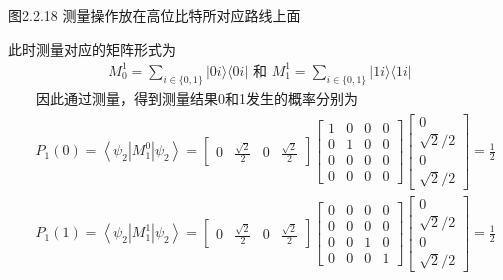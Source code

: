 \documentclass[a4paper,11pt,english]{sphinxmanual}
\begin{document}

\begin{center}图2.2.18 测量操作放在高位比特所对应路线上面
\end{center}
\sphinxAtStartPar
此时测量对应的矩阵形式为
\begin{equation*}
\begin{split}M_{0}^{1}=\sum_{i \in\{0,1\}}|0 i\rangle\langle 0 i| \text { 和 } M_{1}^{1}=\sum_{i \in\{0,1\}}|1 i\rangle\langle 1 i|\end{split}
\end{equation*}
\sphinxAtStartPar
  因此通过测量，得到测量结果0和1发生的概率分别为
\begin{equation*}
\begin{split}\begin{aligned} &P_{1}(0)=\left\langle\psi_{2}\left|M_{1}^{0}\right| \psi_{2}\right\rangle=\left[\begin{array}{cccc} 0 & \frac{\sqrt{2}}{2} & 0 & \frac{\sqrt{2}}{2} \end{array}\right]\left[\begin{array}{cccc} 1 & 0 & 0 & 0 \\ 0 & 1 & 0 & 0 \\ 0 & 0 & 0 & 0 \\ 0 & 0 & 0 & 0 \end{array}\right]\left[\begin{array}{c} 0 \\ \sqrt{2} / 2 \\ 0 \\ \sqrt{2} / 2 \end{array}\right]=\frac{1}{2} \\ &P_{1}(1)=\left\langle\psi_{2}\left|M_{1}^{1}\right| \psi_{2}\right\rangle=\left[\begin{array}{cccc} 0 & \frac{\sqrt{2}}{2} & 0 & \frac{\sqrt{2}}{2} \end{array}\right]\left[\begin{array}{cccc} 0 & 0 & 0 & 0 \\ 0 & 0 & 0 & 0 \\ 0 & 0 & 1 & 0 \\ 0 & 0 & 0 & 1 \end{array}\right]\left[\begin{array}{c} 0 \\ \sqrt{2} / 2 \\ 0 \\ \sqrt{2} / 2 \end{array}\right]=\frac{1}{2} \end{aligned}\end{split}
\end{equation*}
\end{document}
